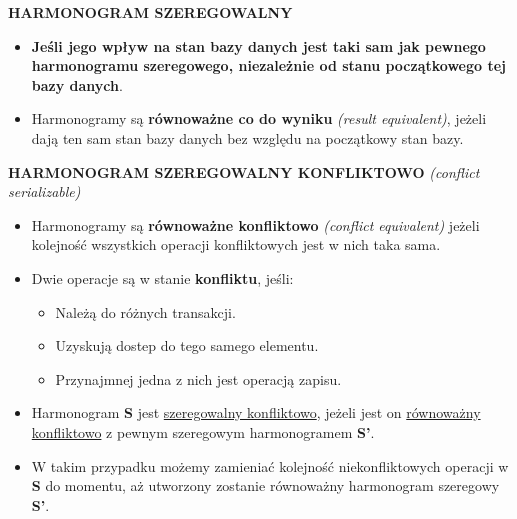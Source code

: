 \documentclass[a5paper,6pt]{article}
\begin{document}
    \vskip 0.5cm

    \textbf{HARMONOGRAM SZEREGOWALNY}
    \begin{itemize}
        \item \textbf{Jeśli jego wpływ na stan bazy danych jest taki sam jak
              pewnego harmonogramu szeregowego, niezależnie od stanu
              początkowego tej bazy danych}.
        \item Harmonogramy są \textbf{równoważne co do wyniku}
              \textit{(result equivalent)}, jeżeli dają ten sam stan bazy danych
              bez względu na początkowy stan bazy.
    \end{itemize}

    \textbf{HARMONOGRAM SZEREGOWALNY KONFLIKTOWO}
    \textit{(conflict serializable)}
    \begin{itemize}
        \item Harmonogramy są \textbf{równoważne konfliktowo}
              \textit{(conflict equivalent)} jeżeli kolejność wszystkich
              operacji konfliktowych jest w nich taka sama.
        \item Dwie operacje są w stanie \textbf{konfliktu}, jeśli:
        \begin{itemize}
            \item Należą do różnych transakcji.
            \item Uzyskują dostep do tego samego elementu.
            \item Przynajmnej jedna z nich jest operacją zapisu.
        \end{itemize}

        \item Harmonogram \textbf{S} jest \underline{szeregowalny konfliktowo},
        jeżeli jest on \underline{równoważny} \underline{konfliktowo} z pewnym
        szeregowym harmonogramem \textbf{S'}.
        \item W takim przypadku możemy zamieniać kolejność niekonfliktowych
        operacji w \textbf{S} do momentu, aż utworzony zostanie równoważny
        harmonogram szeregowy \textbf{S'}.
    \end{itemize}
\end{document}
